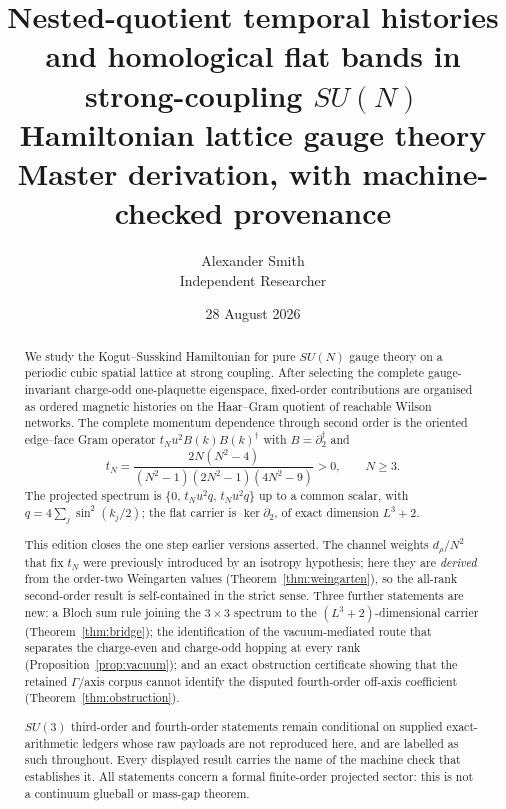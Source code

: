 \documentclass[10pt,twocolumn]{article}
\theoremstyle{plain}
\theoremstyle{definition}
\theoremstyle{remark}
\newcommand{\dg}{^{\dagger}}
\begin{document}
\title{\bfseries Nested-quotient temporal histories and homological flat bands
in strong-coupling $SU(N)$ Hamiltonian lattice gauge theory\\[2mm]
\large Master derivation, with machine-checked provenance}
\author{Alexander Smith\\ \small Independent Researcher}
\date{28 August 2026}
\maketitle

\begin{abstract}
\noindent
We study the Kogut--Susskind Hamiltonian for pure $SU(N)$ gauge theory on a
periodic cubic spatial lattice at strong coupling. After selecting the
complete gauge-invariant charge-odd one-plaquette eigenspace, fixed-order
contributions are organised as ordered magnetic histories on the Haar--Gram
quotient of reachable Wilson networks. The complete momentum dependence
through second order is the oriented edge--face Gram operator
$t_N u^2 B(k)B(k)\dg$ with $B=\partial_2\dg$ and
\[
  t_N=\frac{2N(N^2-4)}{(N^2-1)(2N^2-1)(4N^2-9)}>0,\qquad N\ge 3 .
\]
The projected spectrum is $\{0,\,t_Nu^2q,\,t_Nu^2q\}$ up to a common scalar,
with $q=4\sum_j\sin^2(k_j/2)$; the flat carrier is $\ker\partial_2$, of exact
dimension $L^3+2$.

This edition closes the one step earlier versions asserted. The channel
weights $d_\rho/N^2$ that fix $t_N$ were previously introduced by an isotropy
hypothesis; here they are \emph{derived} from the order-two Weingarten values
(Theorem~\ref{thm:weingarten}), so the all-rank second-order result is
self-contained in the strict sense. Three further statements are new: a Bloch
sum rule joining the $3\times3$ spectrum to the $(L^3+2)$-dimensional carrier
(Theorem~\ref{thm:bridge}); the identification of the vacuum-mediated route
that separates the charge-even and charge-odd hopping at every rank
(Proposition~\ref{prop:vacuum}); and an exact obstruction certificate showing
that the retained $\Gamma$/axis corpus cannot identify the disputed
fourth-order off-axis coefficient (Theorem~\ref{thm:obstruction}).

$SU(3)$ third-order and fourth-order statements remain conditional on supplied
exact-arithmetic ledgers whose raw payloads are not reproduced here, and are
labelled as such throughout. Every displayed result carries the name of the
machine check that establishes it. All statements concern a formal
finite-order projected sector: this is not a continuum glueball or mass-gap
theorem.
\end{abstract}
\end{document}
